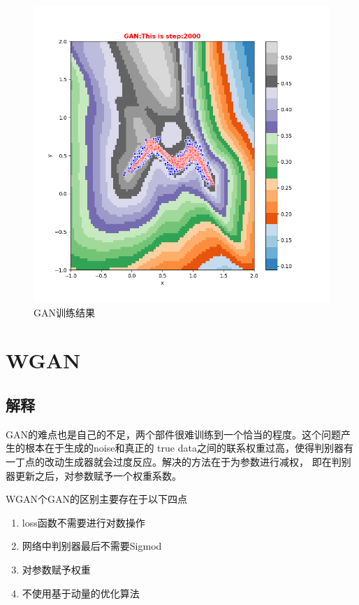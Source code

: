 \documentclass[12pt, a4paper]{report}
\begin{document}
\begin{figure}[ht]
  \centering
  \includegraphics[scale=0.6]{figure1.png}
  \caption{GAN训练结果}
  \label{}
\end{figure}

\chapter{WGAN}

\section{解释}

GAN的难点也是自己的不足，两个部件很难训练到一个恰当的程度。这个问题产生的根本在于生成的noise和真正的
true data之间的联系权重过高，使得判别器有一丁点的改动生成器就会过度反应。解决的方法在于为参数进行减权，
即在判别器更新之后，对参数赋予一个权重系数。

WGAN个GAN的区别主要存在于以下四点
\begin{enumerate}
  \item loss函数不需要进行对数操作
  \item 网络中判别器最后不需要Sigmod
  \item 对参数赋予权重
  \item 不使用基于动量的优化算法
\end{enumerate}
\end{document}
